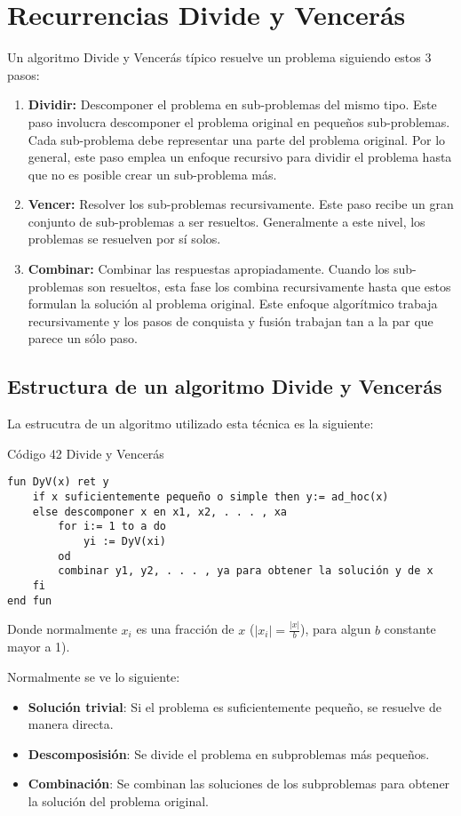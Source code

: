 \chapter{Recurrencias Divide y Vencerás}
Un algoritmo Divide y Vencerás típico resuelve un problema siguiendo estos 3 pasos:
\begin{enumerate}
    \item \textbf{Dividir:} Descomponer el problema en sub-problemas del mismo tipo. Este paso involucra descomponer el problema original en pequeños sub-problemas. Cada sub-problema debe representar una parte del problema original. Por lo general, este paso emplea un enfoque recursivo para dividir el problema hasta que no es posible crear un sub-problema más.
    \item \textbf{Vencer:} Resolver los sub-problemas recursivamente. Este paso recibe un gran conjunto de sub-problemas a ser resueltos. Generalmente a este nivel, los problemas se resuelven por sí solos.
    \item \textbf{Combinar:}  Combinar las respuestas apropiadamente. Cuando los sub-problemas son resueltos, esta fase los combina recursivamente hasta que estos formulan la solución al problema original. Este enfoque algorítmico trabaja recursivamente y los pasos de conquista y fusión trabajan tan a la par que parece un sólo paso.
\end{enumerate}

\section{Estructura de un algoritmo Divide y Vencerás}
La estrucutra de un algoritmo utilizado esta técnica es la siguiente:

\begin{codebox}{Código 42}
\footnotesize Divide y Vencerás
\tcblower
\begin{verbatim}
fun DyV(x) ret y
    if x suficientemente pequeño o simple then y:= ad_hoc(x)
    else descomponer x en x1, x2, . . . , xa
        for i:= 1 to a do 
            yi := DyV(xi) 
        od
        combinar y1, y2, . . . , ya para obtener la solución y de x
    fi
end fun
\end{verbatim}
\end{codebox}
Donde normalmente $x_i$ es una fracción de $x$ ($|x_i| = \frac{|x|}{b}$), para algun $b$ constante mayor a 1).

Normalmente se ve lo siguiente:
\begin{itemize}
    \item \textbf{Solución trivial}: Si el problema es suficientemente pequeño, se resuelve de manera directa.
    \item \textbf{Descomposisión}: Se divide el problema en subproblemas más pequeños.
    \item \textbf{Combinación}: Se combinan las soluciones de los subproblemas para obtener la solución del problema original.
\end{itemize}

